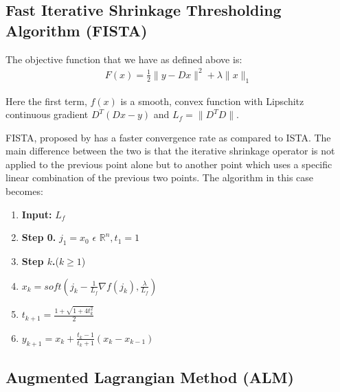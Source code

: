 \documentclass{article} %
\begin{document}
\subsection{Fast Iterative Shrinkage Thresholding Algorithm (FISTA)}

The objective function that we have as defined above is:
\begin{align}
F(x) = \frac{1}{2}\|y - Dx\|^2 + \lambda\|x\|_1
\end{align}

Here the first term, $f(x)$ is a smooth, convex function with Lipschitz continuous gradient $D^T(Dx - y)$ and $L_f = \|D^TD\|$.

FISTA, proposed by \cite{beck2009fast} has a faster convergence rate as compared to ISTA. The main difference between the two is that the iterative shrinkage operator is not applied to the previous point alone but to another point which uses a specific linear combination of the previous two points. The algorithm in this case becomes:

\begin{enumerate}
\item \textbf{Input: }$L_f$
\item \textbf{Step 0. }$j_1 = x_0$ $\epsilon$ $\mathbb{R}^n, t_1 = 1$
\item \textbf{Step $k$.}($k \geq 1$)
\item \hspace{.4cm} $x_k = soft(j_k - \frac{1}{L_f}\nabla f(j_k), \frac{\lambda}{L_f})$
\item \hspace{.4cm} $t_{k+1} = \frac{1+\sqrt{1+4t_k^2}}{2}$
\item \hspace{.4cm} $y_{k+1} = x_k + \frac{t_k-1}{t_k+1}(x_k - x_{k-1})$
\end{enumerate}


  

\subsection{Augmented Lagrangian Method (ALM)}
\end{document}
